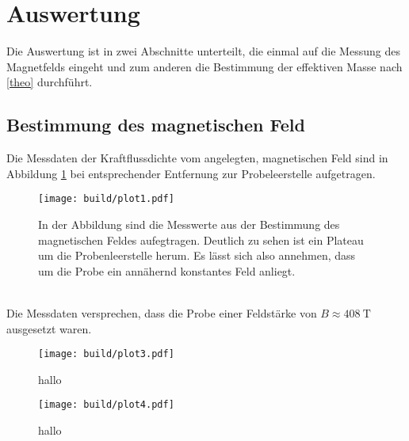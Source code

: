 \newpage
\section{Auswertung}
Die Auswertung ist in zwei Abschnitte unterteilt, die einmal auf die Messung des Magnetfelds eingeht und zum 
anderen die Bestimmung der effektiven Masse nach \ref{theo} durchführt. 
\subsection{Bestimmung des magnetischen Feld}
Die Messdaten der Kraftflussdichte vom angelegten, magnetischen Feld sind in Abbildung \ref{fig:mag}
bei entsprechender Entfernung zur Probeleerstelle aufgetragen.
\begin{figure}
    \centering
    \texttt{[image: build/plot1.pdf]}
    \caption{In der Abbildung sind die Messwerte aus der Bestimmung des magnetischen Feldes aufegtragen. 
            Deutlich zu sehen ist ein Plateau um die Probenleerstelle herum. Es lässt sich also annehmen, dass
            um die Probe ein annähernd konstantes Feld anliegt.}
    \label{fig:mag}
\end{figure}
\\
Die Messdaten versprechen, dass die Probe einer Feldstärke von 
    $B \approx \SI{408}{\tesla}$
ausgesetzt waren.

\begin{figure}
    \centering
    \texttt{[image: build/plot3.pdf]}
    \caption{hallo}
\end{figure}

\begin{figure}
    \centering
    \texttt{[image: build/plot4.pdf]}
    \caption{hallo}
\end{figure}


